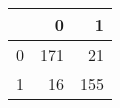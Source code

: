 \begin{tabular}{lrr}
\toprule
{} &    0 &    1 \\
\midrule
0 &  171 &   21 \\
1 &   16 &  155 \\
\bottomrule
\end{tabular}
